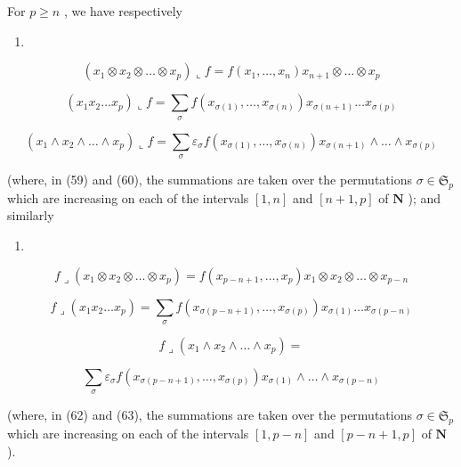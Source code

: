 For \(p \geqslant n\) , we have respectively

\begin{enumerate}
\def\labelenumi{(\arabic{enumi})}
\setcounter{enumi}{57}
\tightlist
\item
\end{enumerate}

\[
\left(x _ {1} \otimes x _ {2} \otimes \dots \otimes x _ {p}\right) \llcorner f = f \left(x _ {1}, \dots , x _ {n}\right) x _ {n + 1} \otimes \dots \otimes x _ {p}\tag{59}
\]

\[
\left(x _ {1} x _ {2} \dots x _ {p}\right) \llcorner f = \sum_ {\sigma} f \left(x _ {\sigma (1)}, \dots , x _ {\sigma (n)}\right) x _ {\sigma (n + 1)} \dots x _ {\sigma (p)}\tag{60}
\]

\[
\left(x _ {1} \wedge x _ {2} \wedge \dots \wedge x _ {p}\right) \llcorner f = \sum_ {\sigma} \varepsilon_ {\sigma} f \left(x _ {\sigma (1)}, \dots , x _ {\sigma (n)}\right) x _ {\sigma (n + 1)} \wedge \dots \wedge x _ {\sigma (p)}
\]

(where, in (59) and (60), the summations are taken over the permutations \(\sigma \in \mathfrak{S}_p\) which are increasing on each of the intervals \([1, n]\) and \([n + 1, p]\) of \(\mathbf{N}\) ); and similarly

\begin{enumerate}
\def\labelenumi{(\arabic{enumi})}
\setcounter{enumi}{60}
\tightlist
\item
\end{enumerate}

\[
f \lrcorner (x _ {1} \otimes x _ {2} \otimes \dots \otimes x _ {p}) = f (x _ {p - n + 1}, \dots , x _ {p}) x _ {1} \otimes x _ {2} \otimes \dots \otimes x _ {p - n}\tag{62}
\]

\[
f \lrcorner (x _ {1} x _ {2} \dots x _ {p}) = \sum_ {\sigma} f (x _ {\sigma (p - n + 1)}, \dots , x _ {\sigma (p)}) x _ {\sigma (1)} \dots x _ {\sigma (p - n)}\tag{63}
\]

\[
f \lrcorner (x _ {1} \wedge x _ {2} \wedge \dots \wedge x _ {p}) =
\]

\[
\sum_ {\sigma} \varepsilon_ {\sigma} f (x _ {\sigma (p - n + 1)}, \dots , x _ {\sigma (p)}) x _ {\sigma (1)} \wedge \dots \wedge x _ {\sigma (p - n)}
\]

(where, in (62) and (63), the summations are taken over the permutations \(\sigma \in \mathfrak{S}_p\) which are increasing on each of the intervals \([1, p - n]\) and \([p - n + 1, p]\) of \(\mathbf{N}\) ).

